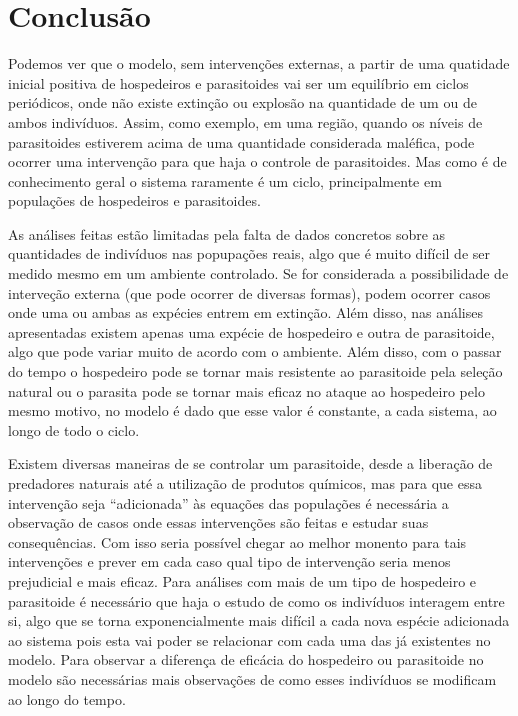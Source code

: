 \section{Conclusão}

Podemos ver que o modelo, sem intervenções externas, a partir de uma quatidade inicial positiva de hospedeiros e parasitoides vai ser um equilíbrio em ciclos periódicos, onde não existe extinção ou explosão na quantidade de um ou de ambos indivíduos. Assim, como exemplo, em uma região, quando os níveis de parasitoides estiverem acima de uma quantidade considerada maléfica, pode ocorrer uma intervenção para que haja o controle de parasitoides. Mas como é de conhecimento geral o sistema raramente é um ciclo, principalmente em populações de hospedeiros e parasitoides.

As análises feitas estão limitadas pela falta de dados concretos sobre as quantidades de indivíduos nas popupações reais, algo que é muito difícil de ser medido mesmo em um ambiente controlado. Se for considerada a possibilidade de interveção externa (que pode ocorrer de diversas formas), podem ocorrer casos onde uma ou ambas as expécies entrem em extinção. Além disso, nas análises apresentadas existem apenas uma expécie de hospedeiro e outra de parasitoide, algo que pode variar muito de acordo com o ambiente. Além disso, com o passar do tempo o hospedeiro pode se tornar mais resistente ao parasitoide pela seleção natural ou o parasita pode se tornar mais eficaz no ataque ao hospedeiro pelo mesmo motivo, no modelo é dado que esse valor é constante, a cada sistema, ao longo de todo o ciclo.

Existem diversas maneiras de se controlar um parasitoide, desde a liberação de predadores naturais até a utilização de produtos químicos, mas para que essa intervenção seja “adicionada” às equações das populações é necessária a observação de casos onde essas intervenções são feitas e estudar suas consequências. Com isso seria possível chegar ao melhor monento para tais intervenções e prever em cada caso qual tipo de intervenção seria menos prejudicial e mais eficaz. Para análises com mais de um tipo de hospedeiro e parasitoide é necessário que haja o estudo de como os indivíduos interagem entre si, algo que se torna exponencialmente mais difícil a cada nova espécie adicionada ao sistema pois esta vai poder se relacionar com cada uma das já existentes no modelo. Para observar a diferença de eficácia do hospedeiro ou parasitoide no modelo são necessárias mais observações de como esses indivíduos se modificam ao longo do tempo.

